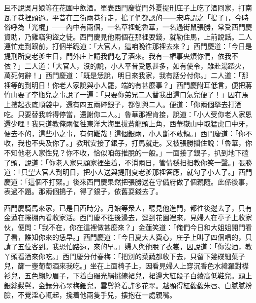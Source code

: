 且不說吳月娘等在花園中飲酒。單表西門慶從門外夏提刑庄子上吃了酒囘家，打南瓦子巷裡頭過。平昔在三街兩巷行走，搗子們都認的——宋時謂之「搗子」，今時俗呼為「光棍」——內中有兩個，一名草裡蛇魯華，一名過街鼠張勝，常受西門慶資助，乃雞竊狗盜之徒。西門慶見他兩個在那裡耍錢，就勒住馬，上前說話。二人連忙走到跟前，打個半跪道：「大官人，這咱晚徃那裡去來？」西門慶道：「今日是提刑所夏老爹生日，門外庄上請我們吃了酒來。我有一樁事央煩你們，依我不依？」二人道：「大官人，沒的說，小人平昔受恩甚多，如有使令，雖赴湯蹈火，萬死何辭！」西門慶道：「既是恁說，明日來我家，我有話分付你。」二人道：「那裡等的到明日！你老人家說與小人罷，端的有甚麼事？」西門慶附耳低言，便把蔣竹山要了李瓶兒之事說了一遍：「只要你弟兄二人替我出這口氣兒便了！」因在馬上摟起衣底順袋中，還有四五兩碎銀子，都倒與二人。便道：「你兩個拏去打酒吃。只要替我幹得停當，還謝你二人。」魯華那裡肯接，說道：「小人受你老人家恩還少哩！我只道教俺兩個徃東洋大海里拔蒼龍頭上角，西華嶽山中取猛虎口中牙，便去不的，這些小之事，有何難哉！這個銀兩，小人斷不敢領。」西門慶道：「你不收，我也不央及你了。」教玳安接了銀子，打馬就走。又被張勝攔住說：「魯華，你不知他老人家性兒？你不收，恰似咱每推脫的一般。」一面接了銀子，扒到地下磕了頭，說道：「你老人家只顧家裡坐着，不消兩日，管情穩抇抇教你笑一聲。」{}張勝道：「只望大官人到明日，把小人送與提刑夏老爹那裡答應，就勾了小人了。」西門慶道：「這個不打緊。」後來西門慶果然把張勝送在守備府做了個親隨。{}此係後事，表過不題。那兩個搗子，得了銀子，依舊耍錢去了。

西門慶騎馬來家，已是日西時分。月娘等衆人，聽見他進門，都徃後邊去了，只有金蓮在捲棚內看收家活。西門慶不徃後邊去，逕到花園裡來，見婦人在亭子上收家伙，便問：「我不在，你在這裡做甚麼來？」金蓮笑道：「俺們今日和大姐姐開門看了看，誰知你來的恁早。」西門慶道：「今日夏大人費心，庄子上叫了四個唱的，只請了五位客到。我恐怕路遠，來的早。」婦人與他脫了衣裳，因說道：「你沒酒，教丫頭看酒來你吃。」西門慶分付春梅：「把別的菜蔬都收下去，只留下幾碟細菓子兒，篩一壺葡萄酒來我吃。」坐在上面椅子上，因看見婦人上穿沉香色水緯羅對襟衫兒，五色縐紗眉子，下着白碾光絹挑線裙兒，裙邊大紅段子白綾高低鞋兒。頭上銀絲鬏髻，金鑲分心翠梅鈿兒，雲鬂簪着許多花翠。越顯得紅馥馥朱唇、白膩膩粉臉，{}不覺淫心輒起，攙着他兩隻手兒，摟抱在一處親嘴。

